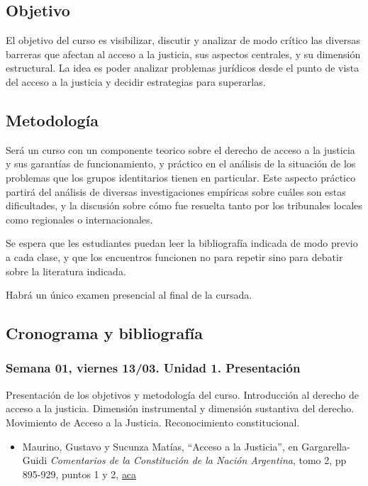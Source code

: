 \documentclass[
]{article}
\providecommand{\tightlist}{%
  \setlength{\itemsep}{0pt}\setlength{\parskip}{0pt}}
\begin{document}
\subsection{Objetivo}\label{objetivo}

El objetivo del curso es visibilizar, discutir y analizar de modo
crítico las diversas barreras que afectan al acceso a la justicia, sus
aspectos centrales, y su dimensión estructural. La idea es poder
analizar problemas jurídicos desde el punto de vista del acceso a la
justicia y decidir estrategias para superarlas.

\subsection{Metodología}\label{metodologuxeda}

Será un curso con un componente teorico sobre el derecho de acceso a la
justicia y sus garantías de funcionamiento, y práctico en el análisis de
la situación de los problemas que los grupos identitarios tienen en
particular. Este aspecto práctico partirá del análisis de diversas
investigaciones empíricas sobre cuáles son estas dificultades, y la
discusión sobre cómo fue resuelta tanto por los tribunales locales como
regionales o internacionales.

Se espera que les estudiantes puedan leer la bibliografía indicada de
modo previo a cada clase, y que los encuentros funcionen no para repetir
sino para debatir sobre la literatura indicada.

Habrá un único examen presencial al final de la cursada.

\subsection{Cronograma y
bibliografía}\label{cronograma-y-bibliografuxeda}

\subsubsection{Semana 01, viernes 13/03. Unidad 1.
Presentación}\label{semana-01-viernes-1303.-unidad-1.-presentaciuxf3n}

Presentación de los objetivos y metodología del curso. Introducción al
derecho de acceso a la justicia. Dimensión instrumental y dimensión
sustantiva del derecho. Movimiento de Acceso a la Justicia.
Reconocimiento constitucional.

\begin{itemize}
\tightlist
\item
  Maurino, Gustavo y Sucunza Matías, ``Acceso a la Justicia'', en
  Gargarella- Guidi \emph{Comentarios de la Constitución de la Nación
  Argentina}, tomo 2, pp 895-929, puntos 1 y 2,
  \href{https://drive.google.com/file/d/1On39ejMciqQNjJIpz1fPseKak_KCjuuF/view?usp=sharing}{aca}
\end{itemize}
\end{document}

